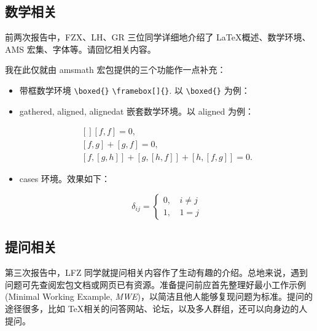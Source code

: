 \subsection{数学相关}
前两次报告中，FZX、LH、GR 三位同学详细地介绍了 \LaTeX 概述、数学环境、AMS 宏集、字体等。请回忆相关内容。

我在此仅就由 amsmath 宏包提供的三个功能作一点补充：
\begin{itemize}
\item 带框数学环境 \verb|\boxed{}| \verb|\framebox[]{}|. 以 \verb|\boxed{}| 为例：
\begin{vertlst}

\boxed{\e^{\iu \theta} = \cos{\theta} + \iu \sin{\theta}}
\end{vertlst}
\item \textsf{gathered}, \textsf{aligned}, \textsf{alignedat} 嵌套数学环境。以 aligned 为例：
\begin{vertlst}

\begin{equation}
\begin{gathered}[]
  [f, f] = 0, \\
  [f, g] + [g, f] = 0, \\
  [f, [g, h]] + [g, [h, f]] + [h, [f, g]] = 0.
\end{gathered}
\end{equation} 
\end{vertlst}
\item cases 环境。效果如下：
\begin{sidelst}
\begin{equation}
  \delta_{ij} =
  \begin{cases}
    0, \, & i \ne j \\
    1, & 1 = j
  \end{cases}
\end{equation}
\end{sidelst}
\end{itemize}


\subsection{提问相关}
第三次报告中，LFZ 同学就提问相关内容作了生动有趣的介绍。总地来说，遇到问题可先查阅宏包文档或网页已有资源。准备提问前应首先整理好最小工作示例 (Minimal Working Example, \emph{MWE})，以简洁且他人能够复现问题为标准。提问的途径很多，比如 \TeX 相关的问答网站、论坛，以及多人群组，还可以向身边的人提问。